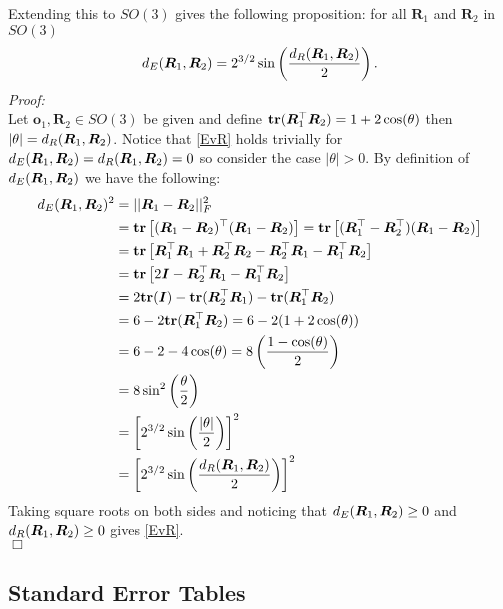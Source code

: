 Extending this to $SO(3)$ gives the following proposition: for all $\bm{R}_1$ and $\bm{R}_2$ in $SO(3)$
\begin{equation}\label{EvR}
{d_E} (\bm{R}_1,\bm{R}_2)=2^{3/2}\sin\left(\frac{{d_R}(\bm{R}_1,\bm{R}_2)}{2}\right).
\end{equation}
\emph{Proof:}\\
Let $\bm{o}_1,\bm{R}_2\in SO(3)$ be given and define ${\mathbf{tr}}(\bm R_1^\top\bm R_2)=1+2\cos(\theta)$ then $|\theta|={d_R}(\bm R_1,\bm R_2)$.  Notice that \eqref{EvR} holds trivially for ${d_E} (\bm R_1,\bm R_2)={d_R}(\bm R_1,\bm R_2)=0$ so consider the case $|\theta|>0$.  By definition of ${d_E} (\bm R_1,\bm R_2)$ we have the following:
\begin{align*}
{d_E} (\bm R_1,\bm R_2)^2
&=||\bm R_1-\bm R_2||_F^2\\
&={\mathbf{tr}}\left[(\bm R_1-\bm R_2)^\top(\bm R_1-\bm R_2)\right]={\mathbf{tr}}\left[(\bm R_1^\top-\bm R_2^\top)(\bm R_1-\bm R_2)\right]\\
&={\mathbf{tr}}\left[\bm R_1^\top\bm R_1+\bm R_2^\top\bm R_2-\bm R_2^\top\bm R_1-\bm R_1^\top\bm R_2\right]\\
&={\mathbf{tr}}\left[2\bm{I}-\bm R_2^\top\bm R_1-\bm R_1^\top\bm R_2\right]\\
&=2{\mathbf{tr}}(\bm{I})-{\mathbf{tr}}(\bm R_2^\top\bm R_1)-{\mathbf{tr}}(\bm R_1^\top\bm R_2)\\
&=6-2{\mathbf{tr}}(\bm R_1^\top\bm R_2)=6-2(1+2\cos(\theta))\\
&=6-2-4\cos(\theta)=8\left(\frac{1-\cos(\theta)}{2}\right)\\
&=8\sin^2\left(\frac{\theta}{2}\right)\\
&=\left[2^{3/2}\sin\left(\frac{|\theta|}{2}\right)\right]^2\\
&=\left[2^{3/2}\sin\left(\frac{{d_R}(\bm R_1,\bm R_2)}{2}\right)\right]^2
\end{align*}
Taking square roots on both sides and noticing that ${d_E} (\bm R_1,\bm R_2)\geq0$ and ${d_R} (\bm R_1,\bm R_2)\geq0$ gives \eqref{EvR}.\\
$\Box$

\subsection{Standard Error Tables}

